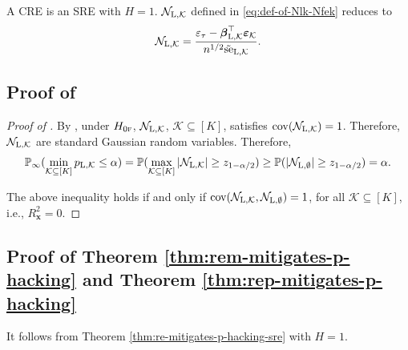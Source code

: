 \documentclass[12pt]{article}
\newcommand{\se}{\textnormal{se}}
\newcommand{\Lin}{\textnormal{L}}
\newcommand{\Prob}{\mathbb{P}}
\newcommand{\cov}{\operatorname{cov}}
\newcommand{\mk}{\mathcal{K}}
\newcommand{\bs}{\boldsymbol}
\begin{document}
  A CRE is an SRE with $H=1$. $\mathcal{N}_{\Lin,\mk}$ defined in \eqref{eq:def-of-Nlk-Nfek} reduces to
  \[
  \mathcal{N}_{\Lin,\mk} = \frac{\varepsilon_{\tau}-\bs{\beta}_{\Lin, \mk}^\top \bs{\varepsilon}_{\mk}}{n^{1/2}\tilde{\se}_{\Lin, \mk}}.
  \]


\subsection{Proof of }
\begin{proof}[Proof of ]

By , under $H_{0\textsc{f}}$, $\mathcal{N}_{\Lin,\mk}$, $\mk\subseteq [K]$, satisfies $\cov(\mathcal{N}_{\Lin,\mk}) = 1$. Therefore, $\mathcal{N}_{\Lin,\mk}$ are standard Gaussian random variables. Therefore, 
\[
\Prob_{\infty}(\min_{\mk\subseteq [K]} p_{\Lin,\mk} \leq \alpha) = \Prob(\max_{\mk\subseteq [K]} |\mathcal{N}_{\Lin,\mk}|\geq z_{1-\alpha/2}) \geq \Prob(|\mathcal{N}_{\Lin,\emptyset}|\geq z_{1-\alpha/2}) = \alpha.
\]

The above inequality holds if and only if $\cov(\mathcal{N}_{\Lin,\mk}, \mathcal{N}_{\Lin,\emptyset}) = 1$, for all $\mk \subseteq [K]$, i.e., $R^2_{\bs{x}}=0$.    
\end{proof}

\subsection{Proof of Theorem \ref{thm:rem-mitigates-p-hacking} and Theorem \ref{thm:rep-mitigates-p-hacking}}
It follows from Theorem \ref{thm:re-mitigates-p-hacking-sre} with $H=1$.
\end{document}
